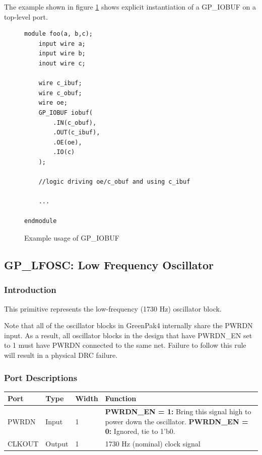 \documentclass{article}
\begin{document}
The example shown in figure \ref{gp-iobuf-example} shows explicit instantiation of a GP\_IOBUF on a top-level port.

\begin{figure}[h]
\begin{lstlisting}
module foo(a, b,c);
	input wire a;
	input wire b;
	inout wire c;
	
	wire c_ibuf;
	wire c_obuf;
	wire oe;
	GP_IOBUF iobuf(
		.IN(c_obuf),
		.OUT(c_ibuf),
		.OE(oe),
		.IO(c)
	);
	
	//logic driving oe/c_obuf and using c_ibuf
	
	...
	
endmodule
\end{lstlisting}
\caption{Example usage of GP\_IOBUF}
\label{gp-iobuf-example}
\end{figure}


\pagebreak
\subsection{GP\_LFOSC: Low Frequency Oscillator}

\subsubsection{Introduction}
This primitive represents the low-frequency (1730 Hz) oscillator block.

Note that all of the oscillator blocks in GreenPak4 internally share the PWRDN input. As a result, all oscillator 
blocks in the design that have PWRDN\_EN set to 1 must have PWRDN connected to the same net. Failure to follow this 
rule will result in a physical DRC failure.

\subsubsection{Port Descriptions}

\begin{tabularx}{5in}{|l|l|l|X|}
\hline
{\bfseries Port} & {\bfseries Type} & {\bfseries Width} & {\bfseries Function} \\
\hline
PWRDN & Input & 1 &
	{\bfseries PWRDN\_EN = 1:} \newline Bring this signal high to power down the oscillator. \newline
	{\bfseries PWRDN\_EN = 0:} \newline Ignored, tie to 1'b0.\\
\hline
CLKOUT & Output & 1 & 1730 Hz (nominal) clock signal \\
\hline
\end{tabularx}
\end{document}
